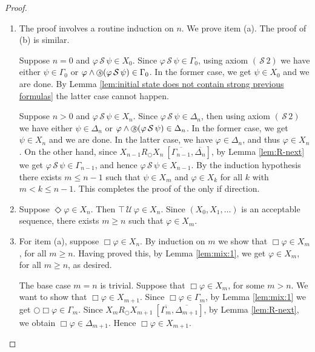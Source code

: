 \documentclass[envcountsect,envcountsame,oribibl,orivec]{llncs}
\newcommand*\circled[1]{\tikz[baseline=(char.base)]{
		\node[shape=circle,draw,inner sep=0.4pt] (char) {#1};}}
\newcommand{\lnext}{\bigcirc}
\newcommand{\lalways}{\Box}
\newcommand{\leventually}{\Diamond}
\newcommand{\luntil}{{\,\mathcal{U}\,}}
\newcommand{\lsince}{{\,\mathcal{S}\,}}
\newcommand{\sprevious}{\circled{\textit{s}}}
\renewcommand{\phi}{\varphi}
\newcommand{\RO}[4]{#1 R_\lnext #2\ [#3, #4]}
\begin{document}
\begin{proof}
	
	\begin{enumerate}
		
		\item The proof involves a routine induction on $n$. We prove item (a). The proof of (b) is similar.
		
		Suppose $n=0$ and $\phi \lsince \psi \in X_0$. Since $\phi \lsince \psi \in \Gamma_0$, using axiom $(\lsince 2)$ we have either $\psi \in \Gamma_0$ or $\phi \wedge \sprevious (\phi \lsince \psi) \in \Gamma_0$. In the former case, we get $\psi \in X_0$ and we are done. By Lemma \ref{lem:initial state does not contain strong previous formulas} the latter case cannot happen. 
		
		Suppose $n>0$ and $\phi \lsince \psi \in X_n$. Since $\phi \lsince \psi \in \Delta_n$, then using axiom $(\lsince 2)$ we have either $\psi \in \Delta_n$ or $\phi \wedge \sprevious (\phi \lsince \psi) \in \Delta_n$. In the former case, we get $\psi \in X_n$ and we are done. In the latter case, we have $\phi \in \Delta_n$, and thus $\phi \in X_n$. On the other hand, since $\RO{X_{n-1}}{X_{n}}{\overline{\Gamma_{n-1}}}{\overline{\Delta_{n}}}$, by Lemma \ref{lem:R-next} we get $\phi \lsince \psi \in \Gamma_{n-1}$, and hence $\phi \lsince \psi \in X_{n-1}$. By the induction hypothesis there exists $m \leq n-1$ such that $\psi \in X_m$ and $\phi \in X_k$ for all $k$ with $m < k \leq n-1$. This completes the proof of the only if direction. 
		
		
		\item Suppose $\leventually \phi \in  X_n$. Then $ \top \luntil  \phi \in X_n$. Since $(X_0, X_1, \ldots)$ is an acceptable sequence, there exists $m \geq n$ such that $\phi \in X_m$.
		
		\item For item (a), suppose $\lalways \phi \in X_n$. By induction on $m$ we show that  $\lalways \phi \in X_m$, for all $m \geq n$. Having proved this, by Lemma \ref{lem:mix:1}, we get $\phi \in X_m$, for all $m \geq n$, as desired. 
		
		The base case $m = n$ is trivial. Suppose that $\lalways \phi \in X_m$, for some $m > n$. We want to show that $\lalways \phi \in X_{m+1}$. Since $\lalways \phi \in \Gamma_m$, by Lemma \ref{lem:mix:1} we get $\lnext \lalways \phi \in \Gamma_m$. Since $\RO{X_{m}}{X_{m+1}}{\overline{\Gamma_{m}}}{\overline{\Delta_{m+1}}}$, by Lemma \ref{lem:R-next}, we obtain $\lalways \phi \in \Delta_{m+1}$.  Hence $\lalways \phi \in X_{m+1}$. 
		

\end{enumerate}
\end{proof}
\end{document}
